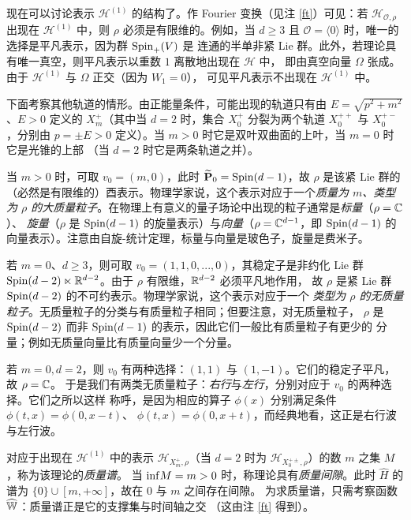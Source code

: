 现在可以讨论表示 $\mathcal H^{(1)}$ 的结构了。作 Fourier 变换（见注 \ref{ft}）可见：若
$\mathcal H_{\mathcal O,\rho}$ 出现在 $\mathcal H^{(1)}$ 中，则 $\rho$ 必须是有限维的。例如，当
$d\ge 3$ 且 $\mathcal O=\langle 0\rangle$ 时，唯一的选择是平凡表示，因为群 ${\rm Spin}_+(V)$ 是
连通的半单非紧 Lie 群。此外，若理论具有唯一真空，则平凡表示以重数 $1$ 离散地出现在 $\mathcal H$ 中，
即由真空向量 $\Omega$ 张成。由于 $\mathcal H^{(1)}$ 与 $\Omega$ 正交（因为 $W_1=0$），
可见平凡表示不出现在 $\mathcal H^{(1)}$ 中。

下面考察其他轨道的情形。由正能量条件，可能出现的轨道只有由 $E=\sqrt{p^2+m^2}$、$E>0$ 定义的
$X_m^+$（其中当 $d=2$ 时，集合 $X_0^+$ 分裂为两个轨道 $X_0^{++}$ 与 $X_0^{+-}$，分别由
$p=\pm E>0$ 定义）。当 $m>0$ 时它是双叶双曲面的上叶，当 $m=0$ 时它是光锥的上部
（当 $d=2$ 时它是两条轨道之并）。

当 $m>0$ 时，可取 $v_0=(m,0)$，此时 $\widetilde{\bold P}_0={\rm Spin}(d-1)$，故 $\rho$ 是该紧
Lie 群的（必然是有限维的）酉表示。物理学家说，这个表示对应于一个\emph{质量为 $m$、类型为 $\rho$
的大质量粒子}。在物理上有意义的量子场论中出现的粒子通常是\emph{标量}（$\rho=\Bbb C$）、
\emph{旋量}（$\rho$ 是 ${\rm Spin}(d-1)$ 的旋量表示）与\emph{向量}（$\rho=\Bbb C^{d-1}$，即
${\rm Spin}(d-1)$ 的向量表示）。注意由自旋-统计定理，标量与向量是玻色子，旋量是费米子。

若 $m=0$、$d\ge 3$，则可取 $v_0=(1,1,0,...,0)$，其稳定子是非约化 Lie 群
${\rm Spin}(d-2)\ltimes \Bbb R^{d-2}$。由于 $\rho$ 有限维，$\Bbb R^{d-2}$ 必须平凡地作用，
故 $\rho$ 是紧 Lie 群 ${\rm Spin}(d-2)$ 的不可约表示。物理学家说，这个表示对应于一个
\emph{类型为 $\rho$ 的无质量粒子}。无质量粒子的分类与有质量粒子相同；但要注意，对无质量粒子，
$\rho$ 是 ${\rm Spin}(d-2)$ 而非 ${\rm Spin}(d-1)$ 的表示，因此它们一般比有质量粒子有更少的
分量；例如无质量向量比有质量向量少一个分量。

若 $m=0,d=2$，则 $v_0$ 有两种选择：$(1,1)$ 与 $(1,-1)$。它们的稳定子平凡，故 $\rho=\Bbb C$。
于是我们有两类无质量粒子：\emph{右行}与\emph{左行}，分别对应于 $v_0$ 的两种选择。它们之所以这样
称呼，是因为相应的算子 $\phi(x)$ 分别满足条件 $\phi(t,x)=\phi(0,x-t)$、
$\phi(t,x)=\phi(0,x+t)$，而经典地看，这正是右行波与左行波。

对应于出现在 $\mathcal H^{(1)}$ 中的表示 $\mathcal H_{X_m^+,\rho}$（当 $d=2$ 时为
$\mathcal H_{X_0^{+\pm},\rho}$）的数 $m$ 之集 $M$，称为该理论的\emph{质量谱}。
当 ${\rm inf} M=m>0$ 时，称理论具有\emph{质量间隙}。此时 $\widehat H$ 的谱为
$\lbrace 0\rbrace\cup [m,+\infty]$，故在 $0$ 与 $m$ 之间存在间隙。
为求质量谱，只需考察函数 $\widehat{\Bbb W}$：质量谱正是它的支撑集与时间轴之交
（这由注 \ref{ft} 得到）。

